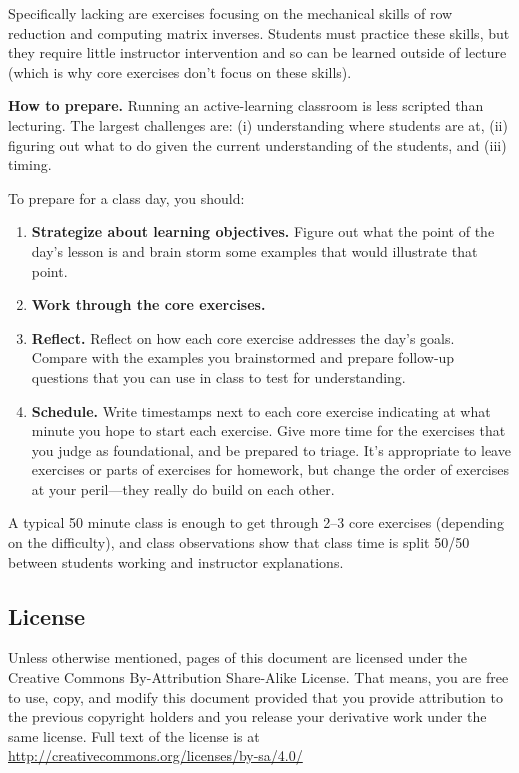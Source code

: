 Specifically lacking are exercises focusing on the mechanical skills of row reduction and
computing matrix inverses. Students must practice these skills, but they require little instructor
intervention and so can be learned outside of lecture (which is why core exercises don't focus on
these skills).

{\bf How to prepare.}
Running an active-learning classroom is less scripted than lecturing.
The largest
challenges are: (i) understanding where students are at, (ii) figuring out what to do given the current
understanding of the students, and (iii) timing.

To prepare for a class day, you should:
\begin{enumerate}
	\item {\bf Strategize about learning objectives.} Figure out what the point of the day's lesson is
		and brain storm some examples that would illustrate that point.
	\item {\bf Work through the core exercises.} 
	\item {\bf Reflect.} Reflect on how each core exercise addresses the day's goals. Compare with the examples you
		brainstormed and prepare follow-up questions that you can use in class to test for understanding.
	\item {\bf Schedule.} Write timestamps next to each core exercise indicating at what minute you hope
		to start each exercise. Give more time for the exercises that you judge as foundational, and be prepared
		to triage. It's appropriate to leave exercises or parts of exercises for homework, but change the order
		of exercises at your peril---they really do build on each other.
\end{enumerate}

A typical
50 minute class is enough to get through 2--3 core exercises (depending on the difficulty), and class observations
show that class time is split 50/50 between students working and instructor explanations.

\subsection*{License}
 Unless otherwise mentioned, pages of this document are licensed under
the Creative Commons By-Attribution Share-Alike License. That means, you are free
to use, copy, and modify this document provided that you provide attribution to the
previous copyright holders and you release your derivative work under the same license.
Full text of the license is at \url{http://creativecommons.org/licenses/by-sa/4.0/}

